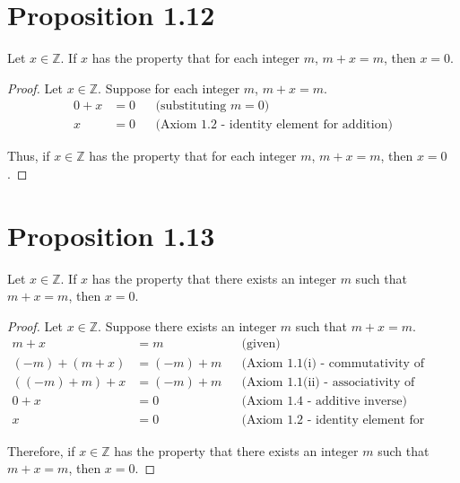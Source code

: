 \section*{Proposition 1.12}
Let $x \in \mathbb{Z}$. If $x$ has the property that for each integer $m$, $m+x = m$, then $x = 0$.
\begin{proof}
    Let $x \in \mathbb{Z}$. Suppose for each integer $m$, $m + x = m$.
    \begin{align*}
        0 + x & = 0 &  & \text{(substituting $m = 0$)}                      \\
        x     & = 0 &  & \text{(Axiom 1.2 - identity element for addition)}
    \end{align*}

    Thus, if $x \in \mathbb{Z}$ has the property that for each integer $m$, $m + x = m$, then $x = 0$.
\end{proof}


\section*{Proposition 1.13}
Let $x \in \mathbb{Z}$. If $x$ has the property that there exists an integer $m$ such that $m+x = m$, then $x = 0$.
\begin{proof}
    Let $x \in \mathbb{Z}$. Suppose there exists an integer $m$ such that $m + x = m$.
    \begin{align*}
        m + x          & = m        &  & \text{(given)}                                     \\
        (-m) + (m + x) & = (-m) + m &  & \text{(Axiom 1.1(i) - commutativity of addition)}  \\
        ((-m) + m) + x & = (-m) + m &  & \text{(Axiom 1.1(ii) - associativity of addition)} \\
        0 + x          & = 0        &  & \text{(Axiom 1.4 - additive inverse)}              \\
        x              & = 0        &  & \text{(Axiom 1.2 - identity element for addition)}
    \end{align*}

    Therefore, if $x \in \mathbb{Z}$ has the property that there exists an integer $m$ such that $m + x = m$, then $x = 0$.
\end{proof}


